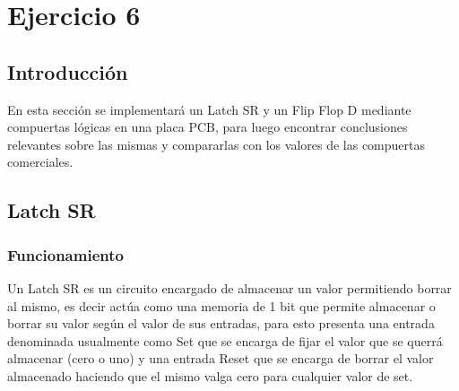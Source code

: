 \section{Ejercicio 6}
\subsection{Introducci\'on}
\noindent
En esta sección se implementará un Latch SR y un Flip Flop D mediante compuertas lógicas en una placa PCB, para luego encontrar conclusiones relevantes sobre las mismas y compararlas con los valores de las compuertas comerciales.
%
\subsection{Latch SR}
\subsubsection{Funcionamiento}
\noindent
Un Latch SR es un circuito encargado de almacenar un valor permitiendo borrar al mismo, es decir actúa como una memoria de 1 bit que permite almacenar o borrar su valor según el valor de sus entradas, para esto presenta una entrada denominada usualmente como Set que se encarga de fijar el valor que se querrá almacenar (cero o uno) y una entrada Reset que se encarga de borrar el valor almacenado haciendo que el mismo valga cero para cualquier valor de set.
%
